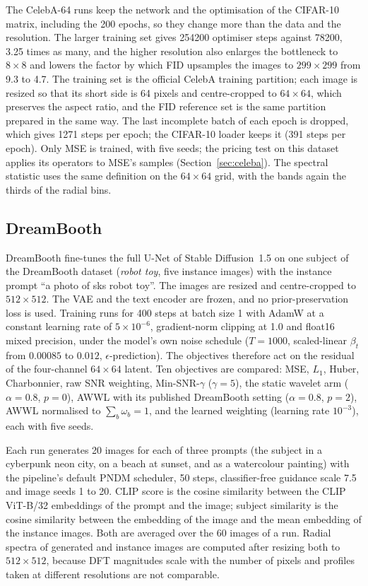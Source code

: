 The CelebA-64 runs keep the network and the optimisation of the CIFAR-10
matrix, including the 200 epochs, so they change more than the data and the
resolution. The larger training set gives \num{254200} optimiser steps
against \num{78200}, 3.25 times as many, and the higher resolution also
enlarges the bottleneck to $8\times8$ and lowers the factor by which FID
upsamples the images to $299\times299$ from 9.3 to 4.7. The training set is
the official CelebA training partition; each image is resized so that its
short side is 64 pixels and centre-cropped to $64\times64$, which preserves
the aspect ratio, and the FID reference set is the same partition prepared in
the same way. The last incomplete batch of each epoch is dropped, which gives
1271 steps per epoch; the CIFAR-10 loader keeps it (391 steps per epoch).
Only MSE is trained, with five seeds; the pricing test on this dataset
applies its operators to MSE's samples (Section~\ref{sec:celeba}). The
spectral statistic uses the same definition on the $64\times64$ grid, with
the bands again the thirds of the radial bins.

\subsection{DreamBooth}
\label{app:setup-dreambooth}

DreamBooth \citep{ruiz2023dreambooth} fine-tunes the full U-Net of Stable
Diffusion~1.5 \citep{rombach2022high} on one subject of the DreamBooth dataset
(\emph{robot toy}, five instance images) with the instance prompt ``a photo of
sks robot toy''. The images are resized and centre-cropped to $512\times512$.
The VAE and the text encoder are frozen, and no prior-preservation loss is
used. Training runs for 400 steps at batch size 1 with AdamW at a constant
learning rate of $5\times10^{-6}$, gradient-norm clipping at 1.0 and float16
mixed precision, under the model's own noise schedule ($T = 1000$,
scaled-linear $\beta_t$ from $0.00085$ to $0.012$, $\epsilon$-prediction). The
objectives therefore act on the residual of the four-channel $64\times64$
latent. Ten objectives are compared: MSE, $L_1$, Huber, Charbonnier, raw SNR
weighting, Min-SNR-$\gamma$ ($\gamma = 5$), the static wavelet arm ($\alpha = 0.8$,
$p = 0$), AWWL with its published DreamBooth setting ($\alpha = 0.8$, $p = 2$),
AWWL normalised to $\sum_b \omega_b = 1$, and the learned weighting (learning
rate $10^{-3}$), each with five seeds.

Each run generates 20 images for each of three prompts (the subject in a
cyberpunk neon city, on a beach at sunset, and as a watercolour painting) with
the pipeline's default PNDM scheduler, 50 steps, classifier-free guidance
scale 7.5 and image seeds 1 to 20. CLIP score is the cosine similarity between
the CLIP ViT-B/32 \citep{radford2021learning} embeddings of the prompt and the
image; subject similarity is the cosine similarity between the embedding of
the image and the mean embedding of the instance images. Both are averaged
over the 60 images of a run. Radial spectra of generated and instance images
are computed after resizing both to $512\times512$, because DFT magnitudes
scale with the number of pixels and profiles taken at different resolutions
are not comparable.


